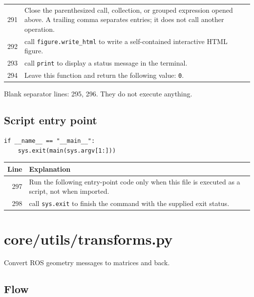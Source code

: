 \documentclass[11pt,a4paper]{book}
\begin{document}
\begin{longtable}{r p{}}
291 & Close the parenthesized call, collection, or grouped expression opened above. A trailing comma separates entries; it does not call another operation. \\

292 & call \texttt{figure.write\_html} to write a self-contained interactive HTML figure. \\

293 & call \texttt{print} to display a status message in the terminal. \\

294 & Leave this function and return the following value: \texttt{0}. \\

\end{longtable}

Blank separator lines: 295, 296. They do not execute anything.

\section{Script entry point}

\begin{lstlisting}[firstnumber=297]
if __name__ == "__main__":
    sys.exit(main(sys.argv[1:]))
\end{lstlisting}

\begin{longtable}{r p{}}

\textbf{Line} & \textbf{Explanation} \\ \hline \endhead

297 & Run the following entry-point code only when this file is executed as a script, not when imported. \\

298 & call \texttt{sys.exit} to finish the command with the supplied exit status. \\

\end{longtable}

\chapter{core/utils/transforms.py}

Convert ROS geometry messages to matrices and back.

\section*{Flow}
\end{document}
